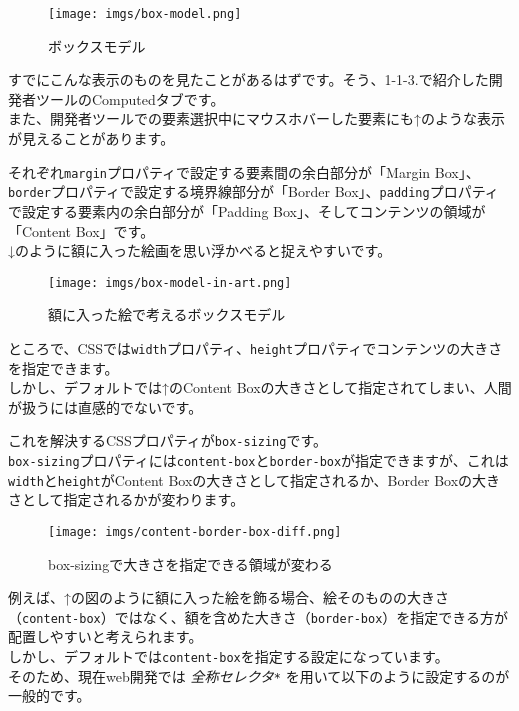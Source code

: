 \begin{figure}
\centering
\texttt{[image: imgs/box-model.png]}
\caption{ボックスモデル}
\end{figure}

すでにこんな表示のものを見たことがあるはずです。そう、1-1-3.で紹介した開発者ツールのComputedタブです。\\
また、開発者ツールでの要素選択中にマウスホバーした要素にも↑のような表示が見えることがあります。

それぞれ\texttt{margin}プロパティで設定する要素間の余白部分が「Margin
Box」、\texttt{border}プロパティで設定する境界線部分が「Border
Box」、\texttt{padding}プロパティで設定する要素内の余白部分が「Padding
Box」、そしてコンテンツの領域が「Content Box」です。\\
↓のように額に入った絵画を思い浮かべると捉えやすいです。

\begin{figure}
\centering
\texttt{[image: imgs/box-model-in-art.png]}
\caption{額に入った絵で考えるボックスモデル}
\end{figure}

ところで、CSSでは\texttt{width}プロパティ、\texttt{height}プロパティでコンテンツの大きさを指定できます。\\
しかし、デフォルトでは↑のContent
Boxの大きさとして指定されてしまい、人間が扱うには直感的でないです。

これを解決するCSSプロパティが\texttt{box-sizing}です。\\
\texttt{box-sizing}プロパティには\texttt{content-box}と\texttt{border-box}が指定できますが、これは\texttt{width}と\texttt{height}がContent
Boxの大きさとして指定されるか、Border
Boxの大きさとして指定されるかが変わります。

\begin{figure}
\centering
\texttt{[image: imgs/content-border-box-diff.png]}
\caption{box-sizingで大きさを指定できる領域が変わる}
\end{figure}

例えば、↑の図のように額に入った絵を飾る場合、絵そのものの大きさ（\texttt{content-box}）ではなく、額を含めた大きさ（\texttt{border-box}）を指定できる方が配置しやすいと考えられます。\\
しかし、デフォルトでは\texttt{content-box}を指定する設定になっています。\\
そのため、現在web開発では \emph{全称セレクタ}\texttt{*}
を用いて以下のように設定するのが一般的です。

\begin{Shaded}
\begin{Highlighting}[]
\OperatorTok{*}\NormalTok{ \{}
  \NormalTok{: }\OperatorTok{;}
\NormalTok{\}}
\end{Highlighting}
\end{Shaded}

